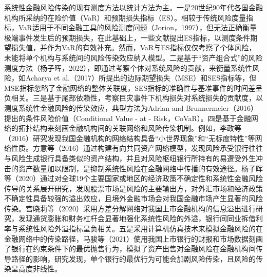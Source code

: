 \documentclass[lang=cn]{elegantpaper}
\begin{document}
系统性金融风险传染的现有测度方法以统计方法为主。一是20世纪90年代各国金融机构所采纳的在险价值（VaR）和预期损失指标（ES）。相较于传统风险度量指标，VaR适用于不同金融工具的风险测度问题（Jorion，1997）\cite{13}，但无法正确衡量极端事件发生后的预期损失，在此基础上，一些文献提出ES指标，以测度条件期望损失值，并作为VaR的有效补充。然而，VaR与ES指标仅仅考察了个体风险，未能将单个机构与系统间的风险传染效应纳入模型。二是基于“资产组合式”的风险测度方法（杨子晖，2022）\cite{07}，即通过考察个体对系统风险的贡献，来衡量系统性风险，如Acharya et al.（2017）\cite{14}所提出的边际期望损失（MSE）和SES指标等，但MSE指标忽略了金融网络的整体关联度，SES指标的准确性与基准事件的时间差呈负相关。三是基于尾部依赖性，考察巨灾事件下机构损失对系统损失的贡献度，以测度系统性金融风险的传染效应，典型方法为Adrian and Brunnermeier（2016）\cite{11}提出的条件风险价值（Conditional Value - at - Risk，CoVaR）。四是基于金融网络的拓扑结构来刻画金融机构间的关联网络和风险传染机制。例如，李政等（2016）\cite{15}研究发现我国金融机构的网络结构具备“小世界现象”和“无标度特性”等网络性质。方意等（2016）\cite{16}通过构建有向共同资产网络模型，发现风险承受银行往往与风险生成银行具备类似的资产结构，并且对风险枢纽银行所持有的易遭受外生冲击的资产数量加以限制，是抑制系统性风险在金融网络中传播的有效途径。杨子晖等（2020）\cite{17}通过对全球19个主要国家或地区的经济政策不确定性和系统性金融风险传导的关系展开研究，发现股票市场是风险的主要输出方，对外汇市场和经济政策不确定性具备较强的溢出效应，且境外金融市场会对我国金融市场产生显著的风险传染。宫晓莉等（2020）\cite{18}采用方差分解网络对我国上市金融机构的信息溢出进行研究，发现通货膨胀和财务杠杆会显著地强化系统性风险的外溢，银行间同业拆借利率与系统性风险外溢指标呈负相关。五是采用计算机仿真技术来模拟金融风险的在金融网络中的传染路径，马骏等（2021）\cite{19}使用我国上市银行的财报和市场数据刻画了银行在约束条件下的最优抛售行为，模拟了资产出售对金融风险在金融机构间传导路径的影响，研究发现，单个银行的最优行为可能会加剧风险传染，且风险的传染呈高度非线性。
\end{document}
